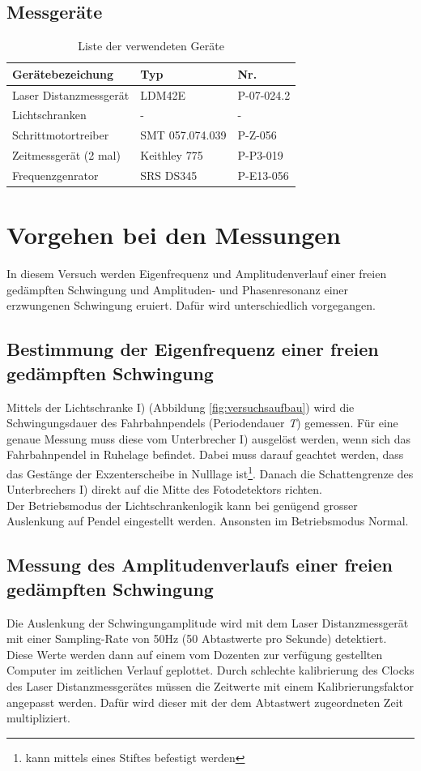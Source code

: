\subsection{Messgeräte}
\label{subsec:messgeraete}
\begin{table}[h]
\centering
	\begin{tabular}{lll} 
	\textbf{Gerätebezeichung} & \textbf{Typ} & \textbf{Nr.} \\ 
	\toprule 
	Laser Distanzmessgerät & LDM42E & P-07-024.2 \\ 
	\hline 
	Lichtschranken & - & - \\ 
	\hline 
	Schrittmotortreiber & SMT 057.074.039 & P-Z-056 \\ 
	\hline 
	Zeitmessgerät (2 mal) & Keithley 775 & P-P3-019 \\ 
	\hline 
	Frequenzgenrator & SRS DS345 & P-E13-056 \\ 
	\bottomrule
	\end{tabular}
\caption{Liste der verwendeten Geräte}
\label{tab:messgeraete}
\end{table}
\section{Vorgehen bei den Messungen}
In diesem Versuch werden Eigenfrequenz und Amplitudenverlauf einer freien gedämpften Schwingung und Amplituden- und Phasenresonanz einer erzwungenen Schwingung eruiert. Dafür wird unterschiedlich vorgegangen.
\subsection{Bestimmung der Eigenfrequenz einer freien gedämpften Schwingung}
Mittels der Lichtschranke I) (Abbildung \ref{fig:versuchsaufbau}) wird die Schwingungsdauer des Fahrbahnpendels (Periodendauer \textit{T}) gemessen. Für eine genaue Messung muss diese vom Unterbrecher I) ausgelöst werden, wenn sich das Fahrbahnpendel in Ruhelage befindet. Dabei muss darauf geachtet werden, dass das Gestänge der Exzenterscheibe in Nulllage ist\footnote{kann mittels eines Stiftes befestigt werden}. Danach die Schattengrenze des Unterbrechers I) direkt auf die Mitte des Fotodetektors richten.
\\[0.5cm]
Der Betriebsmodus der Lichtschrankenlogik kann bei genügend grosser Auslenkung auf \glqq Pendel\grqq\: eingestellt werden. Ansonsten im Betriebsmodus \glqq Normal\grqq.
\subsection{Messung des Amplitudenverlaufs einer freien gedämpften Schwingung}
Die Auslenkung der Schwingungamplitude wird mit dem Laser Distanzmessgerät mit einer Sampling-Rate von 50Hz (50 Abtastwerte pro Sekunde) detektiert. Diese Werte werden dann auf einem vom Dozenten zur verfügung gestellten Computer im zeitlichen Verlauf geplottet. Durch schlechte kalibrierung des Clocks des Laser Distanzmessgerätes müssen die Zeitwerte mit einem Kalibrierungsfaktor angepasst werden. Dafür wird dieser mit der dem Abtastwert zugeordneten Zeit multipliziert. 
